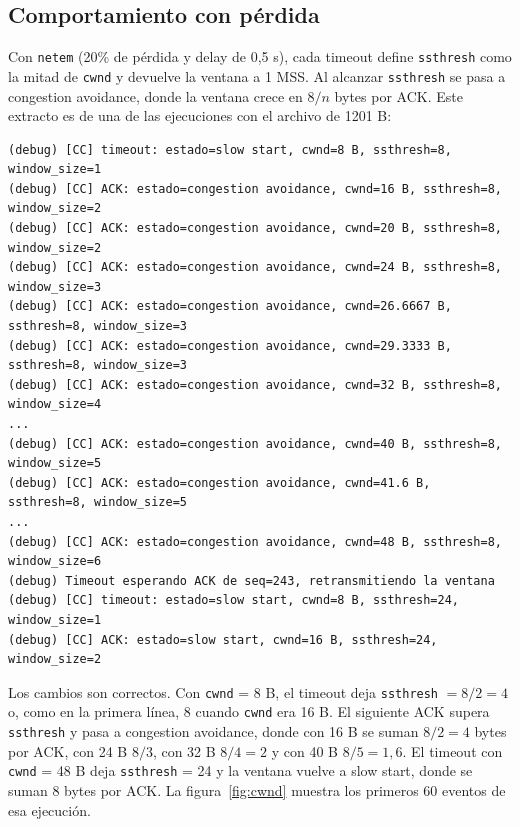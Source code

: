 \documentclass[11pt,letterpaper]{article}
\begin{document}
\subsection{Comportamiento con pérdida}

Con \texttt{netem} (20\% de pérdida y delay de 0,5 s), cada timeout define
\texttt{ssthresh} como la mitad de \texttt{cwnd} y devuelve la ventana a 1 MSS. Al
alcanzar \texttt{ssthresh} se pasa a congestion avoidance, donde la ventana crece en
$8/n$ bytes por ACK. Este extracto es de una de las ejecuciones con el archivo de 1201 B:

\begin{lstlisting}
(debug) [CC] timeout: estado=slow start, cwnd=8 B, ssthresh=8, window_size=1
(debug) [CC] ACK: estado=congestion avoidance, cwnd=16 B, ssthresh=8, window_size=2
(debug) [CC] ACK: estado=congestion avoidance, cwnd=20 B, ssthresh=8, window_size=2
(debug) [CC] ACK: estado=congestion avoidance, cwnd=24 B, ssthresh=8, window_size=3
(debug) [CC] ACK: estado=congestion avoidance, cwnd=26.6667 B, ssthresh=8, window_size=3
(debug) [CC] ACK: estado=congestion avoidance, cwnd=29.3333 B, ssthresh=8, window_size=3
(debug) [CC] ACK: estado=congestion avoidance, cwnd=32 B, ssthresh=8, window_size=4
...
(debug) [CC] ACK: estado=congestion avoidance, cwnd=40 B, ssthresh=8, window_size=5
(debug) [CC] ACK: estado=congestion avoidance, cwnd=41.6 B, ssthresh=8, window_size=5
...
(debug) [CC] ACK: estado=congestion avoidance, cwnd=48 B, ssthresh=8, window_size=6
(debug) Timeout esperando ACK de seq=243, retransmitiendo la ventana
(debug) [CC] timeout: estado=slow start, cwnd=8 B, ssthresh=24, window_size=1
(debug) [CC] ACK: estado=slow start, cwnd=16 B, ssthresh=24, window_size=2
\end{lstlisting}

Los cambios son correctos. Con \texttt{cwnd} = 8 B, el timeout deja
\texttt{ssthresh} $= 8/2 = 4$ o, como en la primera línea, 8 cuando \texttt{cwnd} era
16 B. El siguiente ACK supera \texttt{ssthresh} y pasa a congestion avoidance, donde con
16 B se suman $8/2 = 4$ bytes por ACK, con 24 B $8/3$, con 32 B $8/4 = 2$ y con 40 B
$8/5 = 1{,}6$. El timeout con \texttt{cwnd} = 48 B deja \texttt{ssthresh} = 24 y la
ventana vuelve a slow start, donde se suman 8 bytes por ACK. La figura~\ref{fig:cwnd}
muestra los primeros 60 eventos de esa ejecución.
\end{document}
